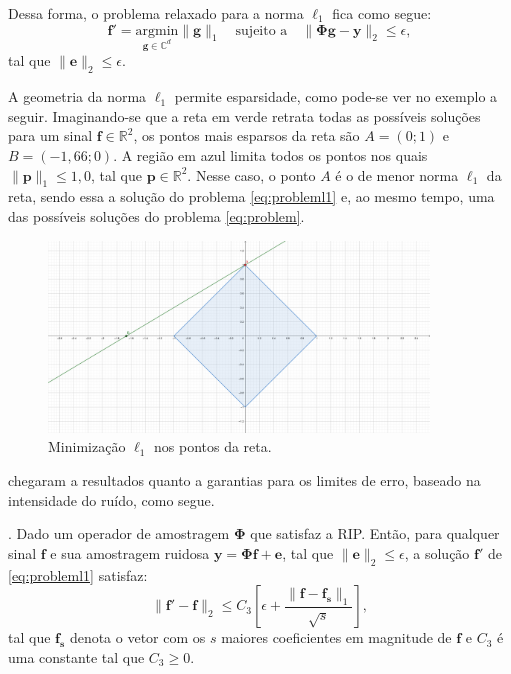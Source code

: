 \documentclass[cic,tc]{iiufrgs}
\renewcommand{\vec}[1]{\bm{#1}}
\begin{document}
Dessa forma, o problema relaxado para a norma $\ell_1$ fica como segue:
\begin{equation}
    \label{eq:probleml1}
    \vec{f'} = \underset{\vec{g} \in \mathbb{C}^d}{\text{argmin}} \lVert \vec{g} \rVert_1 \hspace{1em} \text{sujeito a} \hspace{1em}
    \lVert \mathbf{\Phi} \vec{g} - \vec{y} \rVert_2 \le \epsilon,
\end{equation}
tal que $\lVert \vec{e} \rVert_2 \le \epsilon $.

A geometria da norma $\ell_1$ permite esparsidade, como pode-se ver no exemplo a seguir. Imaginando-se 
que a reta em verde retrata todas as possíveis soluções para um sinal $\vec{f} \in \mathbb{R}^2$, os pontos
mais esparsos da reta são $A=(0;1)$ e $B=(-1,66;0)$. A região em azul limita todos os pontos 
nos quais $\lVert\vec{p}\rVert_1 \le 1,0$, tal que $\vec{p} \in \mathbb{R}^2$. Nesse caso, o ponto $A$ é o 
de menor norma $\ell_1$ da reta, sendo essa a solução do problema \eqref{eq:probleml1} e, ao mesmo tempo, 
uma das possíveis soluções do problema \eqref{eq:problem}.
\begin{figure}[h]
    \caption{Minimização $\ell_1$ nos pontos da reta.}
    \begin{center}
        \includegraphics[width=0.9\textwidth]{img/l1ball}
    \end{center}
    \label{fig:l1ball}
\end{figure}

\citet{candes2006stable} chegaram a resultados quanto a garantias para os limites de erro, baseado na 
intensidade do ruído, como segue.
\begin{teorema}
    \cite{candes2006stable}. 
    Dado um operador de amostragem $\mathbf{\Phi}$ que satisfaz a RIP.
    Então, para qualquer sinal $\vec{f}$ e sua amostragem ruidosa $\vec{y} = \mathbf{\Phi}\vec{f} + \vec{e}$, 
    tal que $\lVert \vec{e} \rVert_2 \le \epsilon$, a solução $\vec{f}'$ de \eqref{eq:probleml1} satisfaz:
    \begin{equation*}
        \lVert \vec{f}' - \vec{f} \rVert_2 \le C_3 \left[ \epsilon + \frac{\lVert \vec{f} - \vec{f_s} \rVert_1}{\sqrt{s}} \right],
    \end{equation*}
    tal que $\vec{f_s}$ denota o vetor com os $s$ maiores coeficientes em magnitude de $\vec{f}$ e $C_3$ é uma
    constante tal que $C_3 \ge 0$.
\end{teorema}
\end{document}
